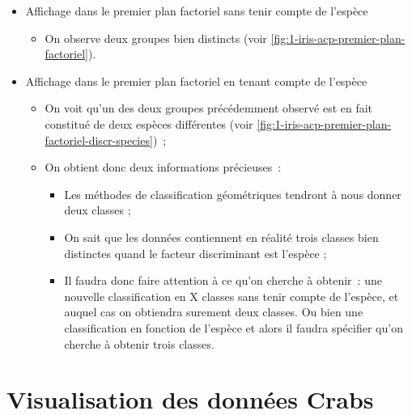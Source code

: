 \documentclass[a4paper,10pt]{report}
\begin{document}
\begin{itemize}
	\item Affichage dans le premier plan factoriel sans tenir compte de l'espèce
	\begin{itemize}
		\item On observe deux groupes bien distincts (voir \autoref{fig:1-iris-acp-premier-plan-factoriel}).
	\end{itemize}

	\item Affichage dans le premier plan factoriel en tenant compte de l'espèce
	\begin{itemize}
		\item On voit qu'un des deux groupes précédemment observé est en fait constitué de deux espèces différentes (voir \autoref{fig:1-iris-acp-premier-plan-factoriel-discr-species})~;
		\item On obtient donc deux informations précieuses~:
		\begin{itemize}
			\item Les méthodes de classification géométriques tendront à nous donner deux classes ;
			\item On sait que les données contiennent en réalité trois classes bien distinctes quand le facteur discriminant est l'espèce ;
			\item Il faudra donc faire attention à ce qu'on cherche à obtenir~: une nouvelle classification en X classes sans tenir compte de l'espèce, et auquel cas on obtiendra surement deux classes. Ou bien une classification en fonction de l'espèce et alors il faudra spécifier qu'on cherche à obtenir trois classes.
		\end{itemize}
	\end{itemize}
\end{itemize}





\section{Visualisation des données Crabs}
\end{document}

